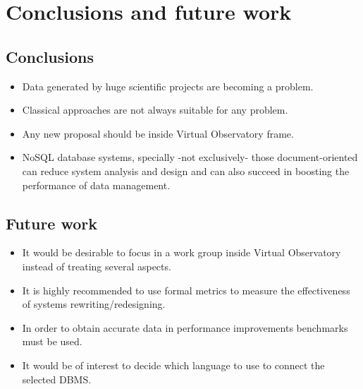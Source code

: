 \chapter{Conclusions and future work}


\section{Conclusions}

\begin{itemize}

\item Data generated by huge scientific projects are becoming a problem.

\item Classical approaches are not always suitable for any problem.

\item Any new proposal should be inside Virtual Observatory frame.

\item NoSQL database systems, specially -not exclusively- those document-oriented can reduce system analysis and design and can also succeed in boosting the performance of data management.

\end{itemize}

\section{Future work}

\begin{itemize}

\item It would be desirable to focus in a work group inside Virtual Observatory instead of treating several aspects.

\item It is highly recommended to use formal metrics to measure the effectiveness of systems rewriting/redesigning.

\item In order to obtain accurate data in performance improvements benchmarks must be used.

\item It would be of interest to decide which language to use to connect the selected DBMS.

\end{itemize}

